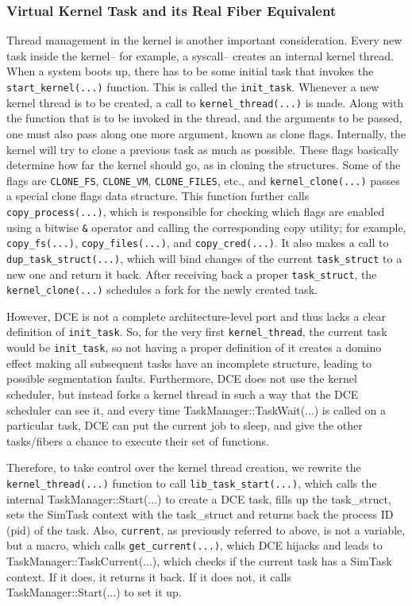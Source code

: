 \documentclass{sig-alternate}
\begin{document}
\subsubsection{Virtual Kernel Task and its Real Fiber Equivalent}
Thread management in the kernel is another important consideration.
Every new task inside the kernel-- for example, a syscall-- 
creates an internal kernel thread.  When a system boots up, there has to be some initial task that invokes the \texttt{start\_kernel(...)} 
function. This is called the \texttt{init\_task}. Whenever a new kernel thread is to be created, a call to \texttt{kernel\_thread(...)} is made. Along with the 
function that is to be invoked in the thread, and the arguments to be passed, one must also pass along one more argument, known as clone flags. 
Internally, the kernel will try to clone a previous task as much as possible. These flags basically determine 
how far the kernel should go, as in cloning the structures. Some of the flags are \texttt{CLONE\_FS}, \texttt{CLONE\_VM}, \texttt{CLONE\_FILES}, etc., and \texttt{kernel\_clone(...)} 
passes a special clone flags data structure. This function further calls \texttt{copy\_process(...)}, which is responsible for checking which 
flags are enabled using a bitwise \texttt{\&} operator and calling the corresponding copy utility; for example, \texttt{copy\_fs(...)}, \texttt{copy\_files(...)}, and \texttt{copy\_cred(...)}.
It also makes a call to \texttt{dup\_task\_struct(...)}, which will bind changes of the current \texttt{task\_struct} to a new one and return it back. After 
receiving
back a proper \texttt{task\_struct}, the \texttt{kernel\_clone(...)} schedules a fork for the newly created task.

However, DCE is not a complete architecture-level port and thus lacks a 
clear definition of \texttt{init\_task}. So, for the very first \texttt{kernel\_thread}, the current task would be \texttt{init\_task}, so not having a proper definition of it creates a domino effect making all subsequent tasks have an incomplete structure, leading to possible segmentation faults.  Furthermore, DCE does not use 
the kernel scheduler, but instead forks a kernel thread in such a way that the DCE scheduler can see it, and every time 
TaskManager::TaskWait(...)  is called on a particular task, DCE can put the current job to sleep, and give the other tasks/fibers a chance to 
execute their set of functions. 

Therefore, to take  control over the kernel thread creation, we rewrite the \texttt{kernel\_thread(...)} function to call \texttt{lib\_task\_start(...)}, which calls the 
internal TaskManager::Start(...) to create a DCE task, fills up the task\_struct, sets the SimTask context with the task\_struct and returns back 
the process ID (pid) of the task. Also, \texttt{current}, as previously referred to above, is not a variable, but a macro, which calls \texttt{get\_current(...)}, which DCE hijacks and leads to TaskManager::TaskCurrent(...), which checks if the current task has a SimTask context. If it does, it returns it back. 
If it does not, it calls TaskManager::Start(...) to set it up.
 
\end{document}
